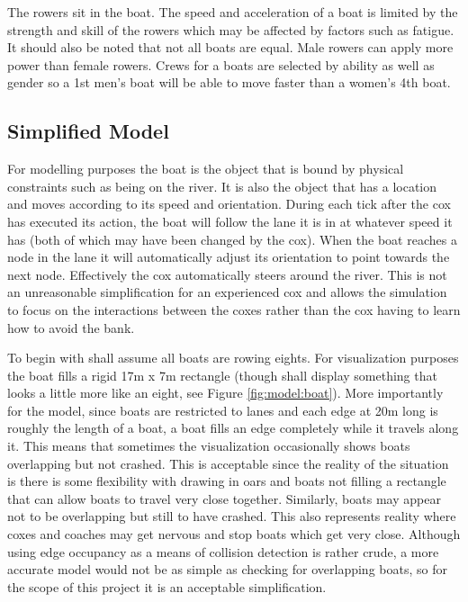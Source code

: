       The rowers sit in the boat. The speed and acceleration of a boat
      is limited by the strength and skill of the rowers which may be affected by factors such as fatigue. It should also be noted that
      not all boats are equal. Male rowers can apply more power than female
      rowers. Crews for a boats are selected by ability as well as gender so a 1st men's boat will
      be able to move faster than a women's 4th boat.
      
      \subsection{Simplified Model}\label{model:boat:simplified}
      For modelling purposes the boat is the object that is bound by physical constraints such as being on the river. It is also the object that has a location and moves according to its speed and orientation. During each tick after the cox has executed its action, the boat will follow the lane it is in at whatever speed it has (both of which may have been changed by the cox). When the boat reaches a node in the lane it will automatically adjust its orientation to point towards the next node. Effectively the cox automatically steers around the river. This is not an unreasonable simplification for an experienced cox and allows the simulation to focus on the interactions between the coxes rather than the cox having to learn how to avoid the bank.
      
      To begin with shall assume all boats are rowing eights. For visualization purposes the boat fills a rigid 17m x 7m rectangle (though shall display something that looks a little more like an eight, see Figure \ref{fig:model:boat}). More importantly for the model, since boats are restricted to lanes and each edge at 20m long is roughly the length of a boat, a boat fills an edge completely while it travels along it. This means that sometimes the visualization occasionally shows boats overlapping but not crashed. This is acceptable since the reality of the situation is there is some flexibility with drawing in oars and boats not filling a rectangle that can allow boats to travel very close together. Similarly, boats may appear not to be overlapping but still to have crashed. This also represents reality where coxes and coaches may get nervous and stop boats which get very close. Although using edge occupancy as a means of collision detection is rather crude, a more accurate model would not be as simple as checking for overlapping boats, so for the scope of this project it is an acceptable simplification.
      
